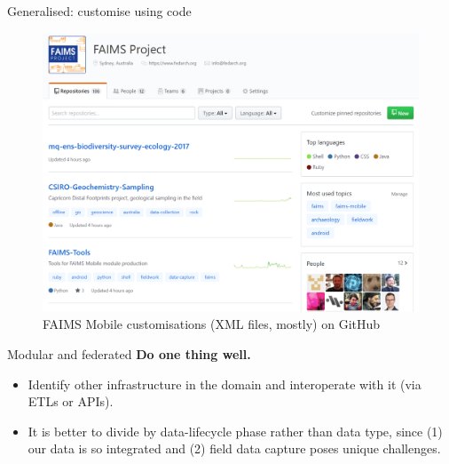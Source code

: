 \begin{frame}{Generalised: customise using code}
 \begin{figure}[H]
    \centering
    \vspace{-0.5cm}
        \includegraphics[height=.725\textheight]{figures/FAIMS-generalised.png}
        \caption{FAIMS Mobile customisations (XML files, mostly) on GitHub}
        \label{fig:figure11}
 \end{figure}
\end{frame}
\begin{frame}{Modular and federated}
  \textbf{Do one thing well.}
      \begin{itemize}
        \item Identify other infrastructure in the domain and interoperate with it (via ETLs or APIs).
        \item It is better to divide by data-lifecycle phase rather than data type, since (1) our data is so integrated and (2) field data capture poses unique challenges.
    \end{itemize}
\end{frame}
